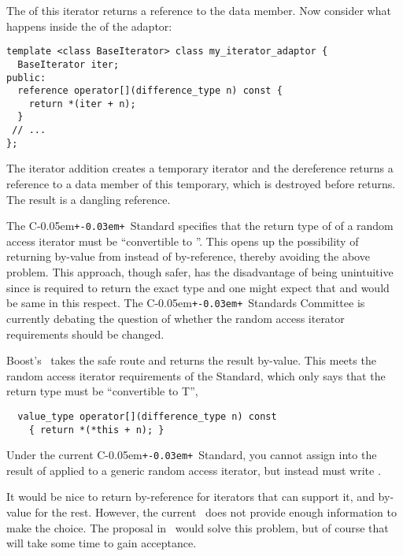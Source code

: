 \documentclass{netobjectdays}
\newcommand{\Cpp}{C\kern-0.05em\texttt{+\kern-0.03em+}}
\newcommand{\iteratoradaptor}{\code{iterator\_\-adaptor}}
\newcommand{\iteratortraits}{\code{iterator\_\-traits}}
\begin{document}
\noindent The  of this iterator returns a reference to
the data member. Now consider what happens inside the
 of the adaptor:

{\footnotesize
\begin{verbatim}
template <class BaseIterator> class my_iterator_adaptor {
  BaseIterator iter;
public:
  reference operator[](difference_type n) const {
    return *(iter + n);
  }
 // ...
};
\end{verbatim}
}

\noindent The iterator addition creates a temporary iterator and the
dereference returns a reference to a data member of this temporary,
which is destroyed before  returns. The result is a
dangling reference.

The \Cpp\ Standard specifies that the return type of 
of a random access iterator must be ``convertible to ''.  This
opens up the possibility of returning by-value from 
instead of by-reference, thereby avoiding the above problem.  This
approach, though safer, has the disadvantage of being unintuitive
since  is required to return the exact type 
and one might expect that  and  would
be same in this respect.  The \Cpp\ Standards Committee is currently
debating the question of whether the random access iterator
requirements should be changed.

Boost's \iteratoradaptor\ takes the safe route and returns the result
by-value. This meets the random access iterator requirements of the
Standard, which only says that the return type must be ``convertible
to T'',

{\footnotesize
\begin{verbatim}
  value_type operator[](difference_type n) const
    { return *(*this + n); }
\end{verbatim}
}

Under the current \Cpp\ Standard, you cannot assign into the result of
 applied to a generic random access iterator,
but instead must write .

It would be nice to return by-reference for iterators that can support
it, and by-value for the rest. However, the current \iteratortraits\
does not provide enough information to make the choice. The proposal
in~\cite{siek01:_improved_iter_cat} would solve this problem, but of
course that will take some time to gain acceptance.


\end{document}
